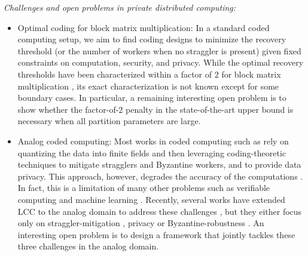 \documentclass[12pt,draftcls,onecolumn]{IEEEtran}
\begin{document}
\emph{Challenges and open problems in private distributed computing:}
\begin{itemize}
\item Optimal coding for block matrix multiplication: In a standard coded computing setup, we aim to find coding designs to minimize the recovery threshold \cite{NIPS2017_7027} (or the number of workers when no straggler is present) given fixed constraints on computation, security, and privacy. While the optimal recovery thresholds have been characterized within a factor of $2$ for block matrix multiplication  \cite{8437563, 9174167}, its exact characterization is not known except for some boundary cases. In particular, a remaining interesting open problem is to show whether the factor-of-$2$ penalty in the state-of-the-art upper bound is necessary when all partition parameters are large.
\item Analog coded computing: Most works in coded computing such as \cite{NIPS2017_7027,pmlr-v89-yu19b,9174167,soleymani2021list,8437563} rely on quantizing the data into finite fields and then leveraging coding-theoretic techniques to mitigate stragglers and Byzantine workers, and to provide data privacy. This approach, however, degrades the accuracy of the computations \cite{soleymani2021analog,soleymani2020privacy}. In fact, this is a limitation of many other problems such as verifiable computing and machine learning \cite{ghodsi2017safetynets,ali2020polynomial}. Recently, several works have extended LCC to the analog domain to address these challenges \cite{subramaniam2019collaborative,jahani2020berrut,soleymani2021analog,soleymani2020privacy}, but they either focus only on straggler-mitigation \cite{jahani2020berrut}, privacy \cite{soleymani2021analog,soleymani2020privacy} or Byzantine-robustness \cite{subramaniam2019collaborative}. An interesting open problem is to design a framework that jointly tackles these three challenges in the analog domain. 
\end{itemize}
\end{document}
